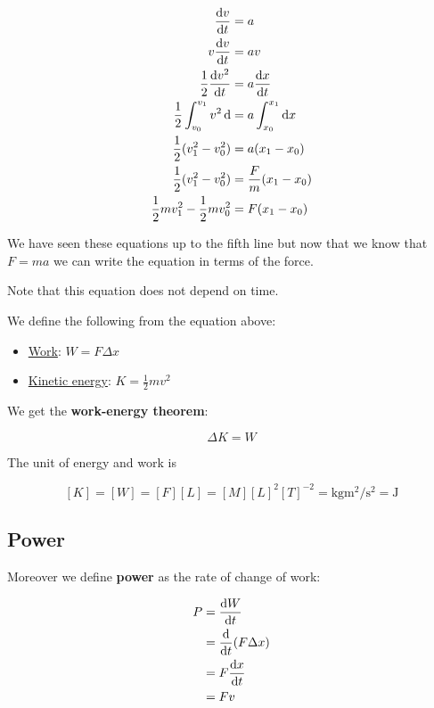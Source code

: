 \documentclass[10pt]{extarticle}
\begin{document}
\begin{align*}
    \dv{v}{t}                                 & = a                         \\
    v \dv{v}{t}                               & = a v                       \\
    \frac{1}{2} \dv{v^2}{t}                   & = a \dv{x}{t}               \\
    \frac{1}{2} \int_{v_0}^{v_1} v^2 \dd{}    & = a \int_{x_0}^{x_1} \dd{x} \\
    \frac{1}{2} (v_1^2 - v_0^2)               & = a (x_1 - x_0)             \\
    \frac{1}{2} (v_1^2 - v_0^2)               & = \frac{F}{m} (x_1 - x_0)   \\
    \frac{1}{2} m v_1^2 - \frac{1}{2} m v_0^2 & = F (x_1 - x_0)
\end{align*}


We have seen these equations up to the fifth line but now that we know that $F = m a$ we can write the equation in terms of the force.

Note that this equation does not depend on time.

We define the following from the equation above:

\begin{itemize}
    \item \underline{Work}: $W = F \Delta x$
    \item \underline{Kinetic energy}: $K = \frac{1}{2} m v^2$
\end{itemize}

We get the \textbf{work-energy theorem}:

$$
    \Delta K = W
$$

The unit of energy and work is

$$
    [K] = [W] = [F][L] = [M][L]^2[T]^{-2} = \si{\kilogram \meter \squared \per \second \squared} = \si{\joule}
$$

\subsection{Power}

Moreover we define \textbf{power} as the rate of change of work:

\begin{align*}
    P & = \dv{W}{t}           \\
      & = \dv{t} (F \Delta x) \\
      & = F \dv{x}{t}         \\
      & = F v
\end{align*}
\end{document}
